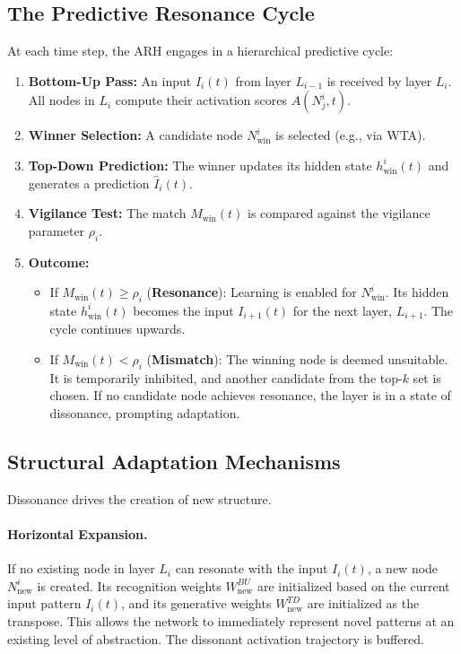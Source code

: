 \documentclass{article}
\begin{document}
\subsection{The Predictive Resonance Cycle}
At each time step, the ARH engages in a hierarchical predictive cycle:
\begin{enumerate}
    \item \textbf{Bottom-Up Pass:} An input $I_i(t)$ from layer $L_{i-1}$ is received by layer $L_i$. All nodes in $L_i$ compute their activation scores $A(N_j^i, t)$.
    \item \textbf{Winner Selection:} A candidate node $N_{\text{win}}^i$ is selected (e.g., via WTA).
    \item \textbf{Top-Down Prediction:} The winner updates its hidden state $h_{\text{win}}^i(t)$ and generates a prediction $\hat{I}_i(t)$.
    \item \textbf{Vigilance Test:} The match $M_{\text{win}}(t)$ is compared against the vigilance parameter $\rho_i$.
    \item \textbf{Outcome:}
    \begin{itemize}
        \item If $M_{\text{win}}(t) \ge \rho_i$ (\textbf{Resonance}): Learning is enabled for $N_{\text{win}}^i$. Its hidden state $h_{\text{win}}^i(t)$ becomes the input $I_{i+1}(t)$ for the next layer, $L_{i+1}$. The cycle continues upwards.
        \item If $M_{\text{win}}(t) < \rho_i$ (\textbf{Mismatch}): The winning node is deemed unsuitable. It is temporarily inhibited, and another candidate from the top-$k$ set is chosen. If no candidate node achieves resonance, the layer is in a state of dissonance, prompting adaptation.
    \end{itemize}
\end{enumerate}

\subsection{Structural Adaptation Mechanisms}
Dissonance drives the creation of new structure.

\paragraph{Horizontal Expansion.} If no existing node in layer $L_i$ can resonate with the input $I_i(t)$, a new node $N_{\text{new}}^i$ is created. Its recognition weights $W_{\text{new}}^{BU}$ are initialized based on the current input pattern $I_i(t)$, and its generative weights $W_{\text{new}}^{TD}$ are initialized as the transpose. This allows the network to immediately represent novel patterns at an existing level of abstraction. The dissonant activation trajectory is buffered.
\end{document}
